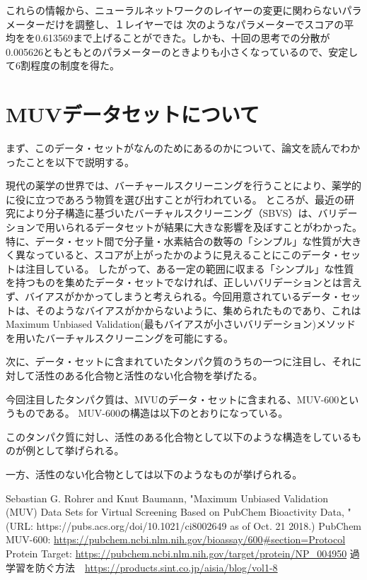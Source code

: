 \documentclass[a4j,11pt]{jarticle}
\begin{document}
これらの情報から、ニューラルネットワークのレイヤーの変更に関わらないパラメーターだけを調整し、１レイヤーでは
次のようなパラメーターでスコアの平均をを0.613569まで上げることができた。しかも、十回の思考での分散が0.005626ともともとのパラメーターのときよりも小さくなっているので、安定して6割程度の制度を得た。



\newpage

\section{MUVデータセットについて}

まず、このデータ・セットがなんのためにあるのかについて、論文\cite{thesis}を読んでわかったことを以下で説明する。


現代の薬学の世界では、バーチャールスクリーニングを行うことにより、薬学的に役に立つであろう物質を選び出すことが行われている。
ところが、最近の研究により分子構造に基づいたバーチャルスクリーニング（SBVS）は、バリデーションで用いられるデータセットが結果に大きな影響を及ぼすことがわかった。特に、データ・セット間で分子量・水素結合の数等の「シンプル」な性質が大きく異なっていると、スコアが上がったかのように見えることにこのデータ・セットは注目している。
したがって、ある一定の範囲に収まる「シンプル」な性質を持つものを集めたデータ・セットでなければ、正しいバリデーションとは言えず、バイアスがかかってしまうと考えられる。今回用意されているデータ・セットは、そのようなバイアスがかからないように、集められたものであり、これはMaximum Unbiased Validation(最もバイアスが小さいバリデーション)メソッドを用いたバーチャルスクリーニングを可能にする。


次に、データ・セットに含まれていたタンパク質のうちの一つに注目し、それに対して活性のある化合物と活性のない化合物を挙げたる。

今回注目したタンパク質は、MVUのデータ・セットに含まれる、MUV-600というものである。
MUV-600の構造は以下のとおりになっている。
\cite{MUV-600}

このタンパク質に対し、活性のある化合物として以下のような構造をしているものが例として挙げられる。

一方、活性のない化合物としては以下のようなものが挙げられる。

\begin{thebibliography}{9}
	 Sebastian G. Rohrer and Knut Baumann, "Maximum Unbiased Validation (MUV) Data Sets for Virtual Screening Based on PubChem Bioactivity Data, " (URL: https://pubs.acs.org/doi/10.1021/ci8002649 as of Oct. 21 2018.)
	 PubChem MUV-600: \url{https://pubchem.ncbi.nlm.nih.gov/bioassay/600#section=Protocol} Protein Target: \url{https://pubchem.ncbi.nlm.nih.gov/target/protein/NP_004950}
	 過学習を防ぐ方法　\url{https://products.sint.co.jp/aisia/blog/vol1-8}
\end{thebibliography}
\end{document}
